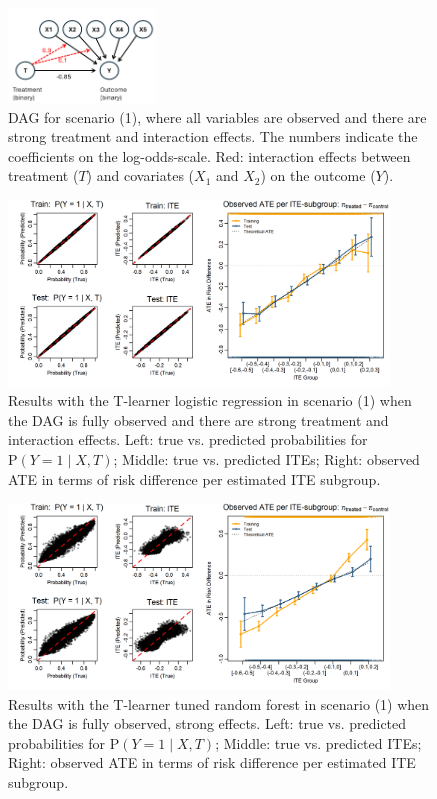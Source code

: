 \begin{figure}[htbp]
\centering
\includegraphics[width=0.35\textwidth]{img/results_ITE_simulation/simulation_observed.png}
\caption{DAG for scenario (1), where all variables are observed and there are strong treatment and interaction effects. The numbers indicate the coefficients on the log-odds-scale. Red: interaction effects between treatment ($T$) and covariates ($X_1$ and $X_2$) on the outcome ($Y$).}
\label{fig:fully_observed_dag}
\end{figure}


\begin{figure}[htbp]
\centering
\includegraphics[width=0.9\textwidth]{img/results_ITE_simulation/fully_observed_glm_tlearner.png}
\caption{Results with the T-learner logistic regression in scenario (1) when the DAG is fully observed and there are strong treatment and interaction effects. Left: true vs. predicted probabilities for $\text{P}(Y=1 \mid X, T)$; Middle: true vs. predicted ITEs; Right: observed ATE in terms of risk difference per estimated ITE subgroup.}
\label{fig:fully_observed_glm_tlearner}
\end{figure}


\begin{figure}[htbp]
\centering
\includegraphics[width=0.9\textwidth]{img/results_ITE_simulation/fully_observed_tuned_rf_tlearner.png}
\caption{Results with the T-learner tuned random forest in scenario (1) when the DAG is fully observed, strong effects. Left: true vs. predicted probabilities for $\text{P}(Y=1 \mid X, T)$; Middle: true vs. predicted ITEs; Right: observed ATE in terms of risk difference per estimated ITE subgroup.}
\label{fig:fully_tuned_rf_tlearner}
\end{figure}


